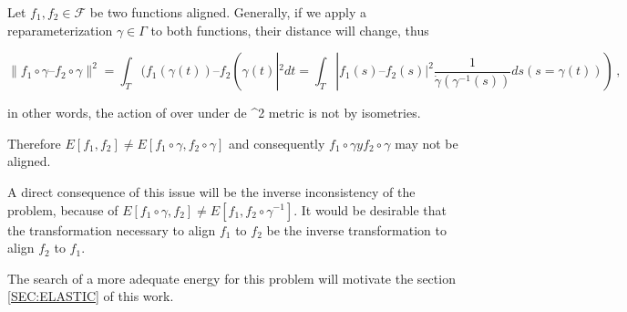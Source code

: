 Let  $f_1, f_2 \in \mathcal{F}$ be two functions aligned. Generally, if we apply
a reparameterization $\gamma\in\Gamma$ to both functions, their distance will
change, thus

$$
\| f_1 \circ \gamma – f_2 \circ \gamma \|^2 = \int_T (f_1(\gamma(t)) –
f_2(\gamma(t)|^2dt =
\int_T |f_1(s) – f_2(s)|^2 \frac{1}{\dot \gamma ( \gamma^{-1}(s))} ds
(s=\gamma(t))) \, ,
$$

in other words, the action of \Gamma over  under de ^2
metric is not by isometries.

Therefore $E[f_1, f_2] \neq E[f_1 \circ \gamma, f_2 \circ \gamma]$ and
consequently $f_1 \circ \gamma y f_2 \circ \gamma$ may not be aligned.

A direct consequence of this issue will be the inverse inconsistency of the
problem, because of $E[f_1 \circ \gamma, f_2] \neq
E[f_1, f_2 \circ \gamma^{-1}]$. It would be desirable that the transformation
necessary to align $f_1$ to $f_2$ be the inverse transformation to align $f_2$
to $f_1$.

The search of a more adequate energy for this problem will motivate the section
\ref{SEC:ELASTIC} of this work.
